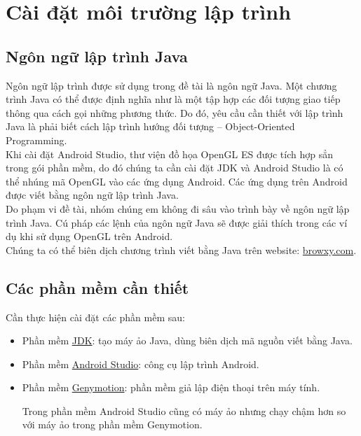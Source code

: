 \documentclass[13pt,a4paper]{extreport}
\begin{document}
\chapter{Cài đặt môi trường lập trình}
\section{Ngôn ngữ lập trình Java}
	Ngôn ngữ lập trình được sử dụng trong đề tài là ngôn ngữ Java. Một chương trình Java có thể được định nghĩa như là một tập hợp các đối tượng giao tiếp thông qua cách gọi những phương thức. Do đó, yêu cầu cần thiết với lập trình Java là phải biết cách lập trình hướng đối tượng -- Object-Oriented Programming.\\
	
	Khi cài đặt Android Studio, thư viện đồ họa OpenGL ES được tích hợp sẳn trong gói phần mềm, do đó chúng ta cần cài đặt JDK và Android Studio là có thể nhúng mã OpenGL vào các ứng dụng Android. Các ứng dụng trên Android được viết bằng ngôn ngữ lập trình Java.\\
	
	Do phạm vi đề tài, nhóm chúng em không đi sâu vào trình bày về ngôn ngữ lập trình Java. Cú pháp các lệnh của ngôn ngữ Java sẽ được giải thích trong các ví dụ khi sử dụng OpenGL trên Android.\\
	
	Chúng ta có thể biên dịch chương trình viết bằng Java trên website: \href{http://browxy.com/}{browxy.com}.
\section{Các phần mềm cần thiết}
	Cần thực hiện cài đặt các phần mềm sau:
	\begin{itemize}
		\item Phần mềm \href{http://www.oracle.com/technetwork/java/javase/downloads/jdk8-downloads-2133151.html}{JDK}: tạo máy ảo Java, dùng biên dịch mã nguồn viết bằng Java.
		\item Phần mềm \href{https://developer.android.com/studio/index.html}{Android Studio}: công cụ lập trình Android.
		
		\item Phần mềm \href{https://www.genymotion.com/}{Genymotion}: phần mềm giả lập điện thoại trên máy tính.
			
			Trong phần mềm Android Studio cũng có máy ảo nhưng chạy chậm hơn so với máy ảo trong phần mềm Genymotion.		
	\end{itemize}
	
\end{document}

